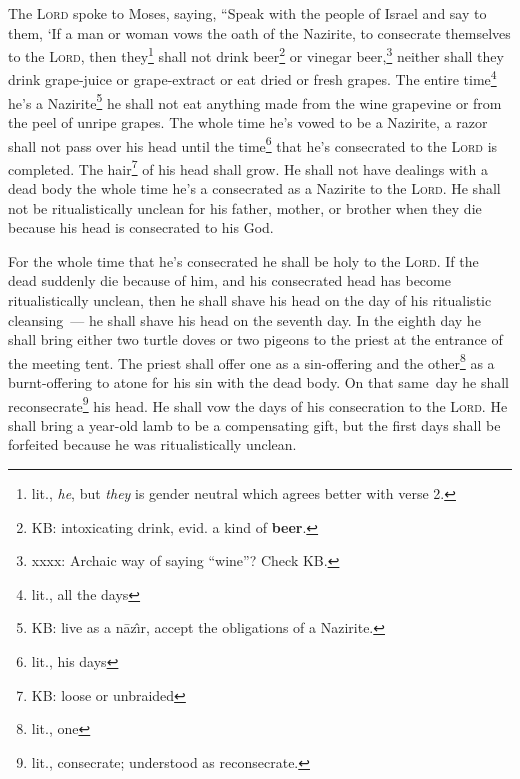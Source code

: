 
\begin{inparaenum}
     The \textsc{Lord} spoke to Moses, saying,%
     ``Speak with the people of Israel and say to them, `If a man or woman vows the oath of the Nazirite, to consecrate themselves to the \textsc{Lord},%
     then they\footnote{lit., \textit{he}, but \textit{they} is gender neutral which agrees better with verse 2.} shall not drink beer\footnote{KB: intoxicating drink, evid\@. a kind of \textbf{beer}.} or vinegar beer,\footnote{xxxx: Archaic way of saying ``wine''? Check KB.} neither shall they drink grape-juice or grape-extract or eat dried or fresh grapes.%
     The entire time\footnote{lit., all the days} he's a Nazirite\footnote{KB: live as a n\=az\^\i{}r, accept the obligations of a Nazirite.} he shall not eat anything made from the wine grapevine or from the peel of unripe grapes.%
     The whole time he's vowed to be a Nazirite, a razor shall not pass over his head until the time\footnote{lit., his days} that he's consecrated to the \textsc{Lord} is completed. The hair\footnote{KB: loose or unbraided} of his head shall grow.%
     He shall not have dealings with a dead body the whole time he's a consecrated as a Nazirite to the \textsc{Lord}.%
     He shall not be ritualistically unclean for his father, mother, or brother when they die because his head is consecrated to his God.%
    
     For the whole time that he's consecrated he shall be holy to the \textsc{Lord}.%
     If the dead suddenly die because of him, and his consecrated head has become ritualistically unclean, then he shall shave his head on the day of his ritualistic cleansing~--- he shall shave his head on the seventh day.%
     In the eighth day he shall bring either two turtle doves or two pigeons to the priest at the entrance of the meeting tent.%
     The priest shall offer one as a sin-offering and the other\footnote{lit., one} as a burnt-offering to atone for his sin with the dead body. On that same\understood\ day he shall reconsecrate\footnote{lit., consecrate; understood as reconsecrate.} his head.%
     He shall vow the days of his consecration to the \textsc{Lord}. He shall bring a year-old lamb to be a compensating gift, but the first days shall be forfeited because he was ritualistically unclean.%
    

\end{inparaenum}
